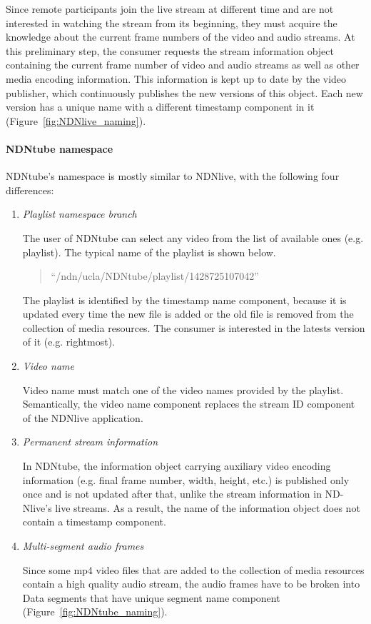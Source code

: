 Since remote participants join the live stream at different time and are not interested in watching the stream from its beginning, they must acquire the knowledge about the current frame numbers of the video and audio streams. At this preliminary step, the consumer requests the stream information object containing the current frame number of video and audio streams as well as other media encoding information. This information is kept up to date by the video publisher, which continuously publishes the new versions of this object. Each new version has a unique name with a different timestamp component in it (Figure~\ref{fig:NDNlive_naming}).


\paragraph{NDNtube namespace} %
\label{par:NDNtube_naming}
\vspace{0.3cm}

NDNtube's namespace is mostly similar to NDNlive, with the following four differences:
\begin{enumerate}
	\item{\textit{Playlist namespace branch}} 
		
		The user of NDNtube can select any video from the list of available ones (e.g. playlist). The typical name of the playlist is shown below.
		\begin{quote}
		``/ndn/ucla/NDNtube/playlist/1428725107042''
		\end{quote}
    The playlist is identified by the timestamp name component, because it is updated every time the new file is added or the old file is removed from the collection of media resources. The consumer is interested in the latests version of it (e.g. rightmost).
    
	\item{\textit{Video name}} 

		Video name must match one of the video names provided by the playlist. Semantically, the video name component replaces the stream ID component of the NDNlive application.

	\item{\textit{Permanent stream information}} 

    In NDNtube, the information object carrying auxiliary video encoding information (e.g. final frame number, width, height, etc.) is published only once and is not updated after that, unlike the stream information in ND-Nlive's live streams. As a result, the name of the information object does not contain a timestamp component.

	\item{\textit{Multi-segment audio frames}} 
	
   Since some mp4 video files that are added to the collection of media resources contain a high quality audio stream, the audio frames have to be broken into Data segments that have unique segment name component (Figure~\ref{fig:NDNtube_naming}).
\end{enumerate}

